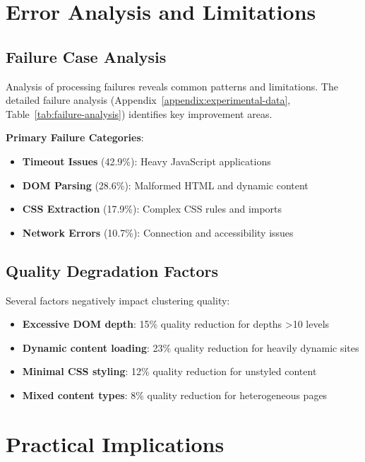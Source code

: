 \section{Error Analysis and Limitations}
\label{sec:error-analysis}

\subsection{Failure Case Analysis}
\label{subsec:failure-cases}

Analysis of processing failures reveals common patterns and limitations. The detailed failure analysis (Appendix~\ref{appendix:experimental-data}, Table~\ref{tab:failure-analysis}) identifies key improvement areas.

\textbf{Primary Failure Categories}:
\begin{itemize}
    \item \textbf{Timeout Issues} (42.9\%): Heavy JavaScript applications
    \item \textbf{DOM Parsing} (28.6\%): Malformed HTML and dynamic content
    \item \textbf{CSS Extraction} (17.9\%): Complex CSS rules and imports
    \item \textbf{Network Errors} (10.7\%): Connection and accessibility issues
\end{itemize}

\subsection{Quality Degradation Factors}
\label{subsec:quality-factors}

Several factors negatively impact clustering quality:

\begin{itemize}
    \item \textbf{Excessive DOM depth}: 15\% quality reduction for depths >10 levels
    \item \textbf{Dynamic content loading}: 23\% quality reduction for heavily dynamic sites
\item \textbf{Minimal CSS styling}: 12\% quality reduction for unstyled content
\item \textbf{Mixed content types}: 8\% quality reduction for heterogeneous pages
\end{itemize}

\section{Practical Implications}
\label{sec:practical-implications}


